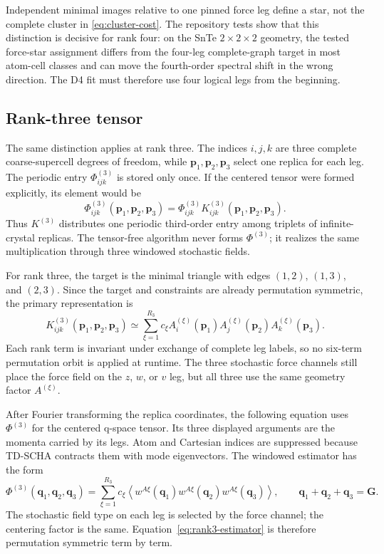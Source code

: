 \documentclass{article}
\begin{document}
Independent minimal images relative to one pinned force leg define a star,
not the complete cluster in \autoref{eq:cluster-cost}. The repository tests
show that this distinction is decisive for rank four: on the SnTe
$2\times2\times2$ geometry, the tested force-star assignment differs from
the four-leg complete-graph target in most atom-cell classes and can move
the fourth-order spectral shift in the wrong direction. The D4 fit must
therefore use four logical legs from the beginning.

\subsection{Rank-three tensor}
\label{sec:rank3}

The same distinction applies at rank three. The indices $i,j,k$ are three
complete coarse-supercell degrees of freedom, while
$\bm p_1,\bm p_2,\bm p_3$ select one replica for each leg. The periodic
entry $\Phi^{(3)}_{ijk}$ is stored only once. If the centered tensor were
formed explicitly, its element would be
\begin{equation}
    \varPhi^{(3)}_{ijk}(\bm p_1,\bm p_2,\bm p_3)
    =
    \Phi^{(3)}_{ijk}
    K^{(3)}_{ijk}(\bm p_1,\bm p_2,\bm p_3).
    \label{eq:rank3-extension}
\end{equation}
Thus $K^{(3)}$ distributes one periodic third-order entry among triplets of
infinite-crystal replicas. The tensor-free algorithm never forms
$\varPhi^{(3)}$; it realizes the same multiplication through three
windowed stochastic fields.

For rank three, the target is the minimal triangle with edges
$(1,2)$, $(1,3)$, and $(2,3)$. Since the target and constraints are already
permutation symmetric, the primary representation is
\begin{equation}
    K^{(3)}_{ijk}
    (\bm p_1,\bm p_2,\bm p_3)
    \simeq
    \sum_{\xi=1}^{R_3}c_\xi
    A_i^{(\xi)}(\bm p_1)
    A_j^{(\xi)}(\bm p_2)
    A_k^{(\xi)}(\bm p_3).
    \label{eq:rank3-factorization}
\end{equation}
Each rank term is invariant under exchange of complete leg labels, so no
six-term permutation orbit is applied at runtime. The three stochastic
force channels still place the force field on the $z$, $w$, or $v$ leg,
but all three use the same geometry factor $A^{(\xi)}$.

After Fourier transforming the replica coordinates, the following equation
uses $\varPhi^{(3)}$ for the centered q-space tensor. Its three displayed
arguments are the momenta carried by its legs. Atom and Cartesian indices
are suppressed because TD-SCHA contracts them with mode eigenvectors. The
windowed estimator has the form
\begin{equation}
    \varPhi^{(3)}(\bm q_1,\bm q_2,\bm q_3)
    =
    \sum_{\xi=1}^{R_3}c_\xi
    \left\langle
    w^{A\xi}(\bm q_1)
    w^{A\xi}(\bm q_2)
    w^{A\xi}(\bm q_3)
    \right\rangle,
    \qquad
    \bm q_1+\bm q_2+\bm q_3=\bm G.
    \label{eq:rank3-estimator}
\end{equation}
The stochastic field type on each leg is selected by the force channel; the
centering factor is the same. Equation~\eqref{eq:rank3-estimator} is
therefore permutation symmetric term by term.
\end{document}
